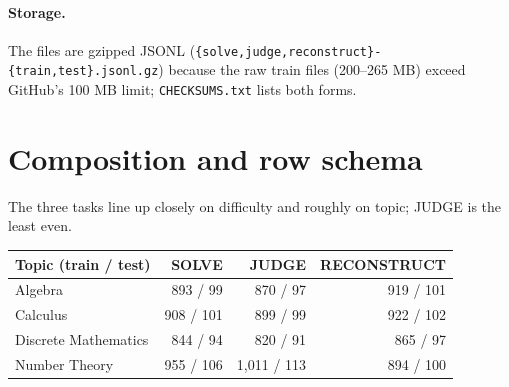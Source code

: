 \documentclass[11pt,a4paper]{article}
\newcommand{\code}[1]{\texttt{#1}}
\begin{document}
\paragraph{Storage.} The files are gzipped JSONL (\code{\{solve,judge,reconstruct\}-\{train,test\}.jsonl.gz}) because the raw train files (200--265 MB) exceed GitHub's 100 MB limit; \code{CHECKSUMS.txt} lists both forms.

\section{Composition and row schema}

The three tasks line up closely on difficulty and roughly on topic; JUDGE is the least even.

\begin{table}[H]
\centering\small
\begin{tabular}{@{}lrrr@{}}
\toprule
Topic (train / test) & SOLVE & JUDGE & RECONSTRUCT \\
\midrule
Algebra & 893 / 99 & 870 / 97 & 919 / 101 \\
Calculus & 908 / 101 & 899 / 99 & 922 / 102 \\
Discrete Mathematics & 844 / 94 & 820 / 91 & 865 / 97 \\
Number Theory & 955 / 106 & 1,011 / 113 & 894 / 100 \\
\bottomrule
\end{tabular}
\end{table}
\end{document}
